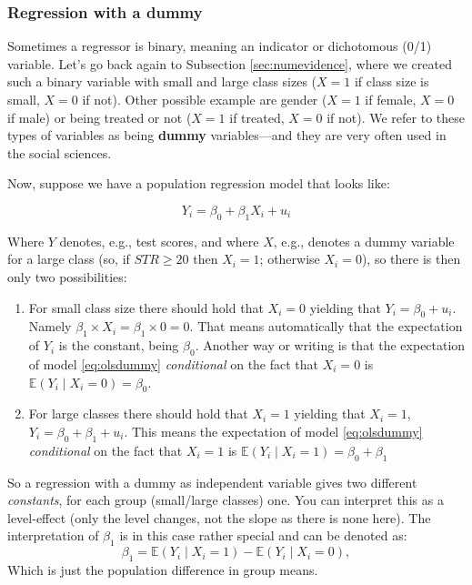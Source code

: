 \documentclass[
]{book}
\providecommand{\tightlist}{%
  \setlength{\itemsep}{0pt}\setlength{\parskip}{0pt}}
\begin{document}
\hypertarget{sec:dummy}{%
\subsubsection{Regression with a dummy}\label{sec:dummy}}

Sometimes a regressor is binary, meaning an indicator or dichotomous (0/1) variable. Let's go back again to Subsection \ref{sec:numevidence}, where we created such a binary variable with small and large class sizes (\(X=1\) if class size is small, \(X=0\) if not). Other possible example are gender (\(X=1\) if female, \(X=0\) if male) or being treated or not (\(X=1\) if treated, \(X=0\) if not). We refer to these types of variables as being \textbf{dummy} variables---and they are very often used in the social sciences.

Now, suppose we have a population regression model that looks like:

\begin{equation}
Y_i = \beta_0 + \beta_1 X_i + u_i
\label{eq:olsdummy}
\end{equation}

Where \(Y\) denotes, e.g., test scores, and where \(X\), e.g., denotes a dummy variable for a large class (so, if \(STR \geq 20\) then \(X_i = 1\); otherwise \(X_i = 0\)), so there is then only two possibilities:

\begin{enumerate}
\def\labelenumi{\arabic{enumi}.}
\tightlist
\item
  For small class size there should hold that \(X_i = 0\) yielding that \(Y_i = \beta_0 + u_i\). Namely \(\beta_1 \times X_i = \beta_1 \times 0 = 0\). That means automatically that the expectation of \(Y_i\) is the constant, being \(\beta_0\). Another way or writing is that the expectation of model \eqref{eq:olsdummy} \emph{conditional} on the fact that \(X_i = 0\) is \(\mathbb{E}(Y_i \mid X_i = 0) = \beta_0\).
\item
  For large classes there should hold that \(X_i = 1\) yielding that \(X_i = 1\), \(Y_i = \beta_0 + \beta_1 + u_i\). This means the expectation of model \eqref{eq:olsdummy} \emph{conditional} on the fact that \(X_i = 1\) is \(\mathbb{E}(Y_i \mid X_i = 1) = \beta_0 + \beta_1\)
\end{enumerate}

So a regression with a dummy as independent variable gives two different \emph{constants}, for each group (small/large classes) one. You can interpret this as a level-effect (only the level changes, not the slope as there is none here). The interpretation of \(\beta_1\) is in this case rather special and can be denoted as:
\begin{equation}
\beta_1 = \mathbb{E}(Y_i \mid X_i = 1) - \mathbb{E}(Y_i \mid X_i = 0),
\end{equation}
Which is just the population difference in group means.
\end{document}
